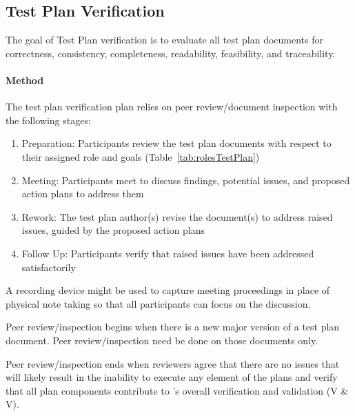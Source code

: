 \subsection{Test Plan Verification}\label{sec:mtpVV}
The goal of Test Plan verification is to evaluate all test plan documents for
correctness, consistency, completeness, readability, feasibility, and
traceability.

\paragraph{Method} The test plan verification plan relies on peer
review/document inspection with the following stages:
\begin{enumerate}

    \item Preparation: Participants review the test plan documents with respect
    to their assigned role and goals (Table~\ref{tab:rolesTestPlan})

    \item Meeting: Participants meet to discuss findings, potential issues, and
    proposed action plans to address them

    \item Rework: The test plan author(s) revise the document(s) to address
    raised issues, guided by the proposed action plans

    \item Follow Up: Participants verify that raised issues have been addressed
    satisfactorily

\end{enumerate}

A recording device might be used to capture meeting proceedings in place of
physical note taking so that all participants can focus on the discussion.

Peer review/inspection begins when there is a new major version of a test plan
document. Peer review/inspection need be done on those documents only.

Peer review/inspection ends when reviewers agree that there are no issues that
will likely result in the inability to execute any element of the plans and
verify that all plan components contribute to \progname{}'s overall
verification and validation (V \& V).


